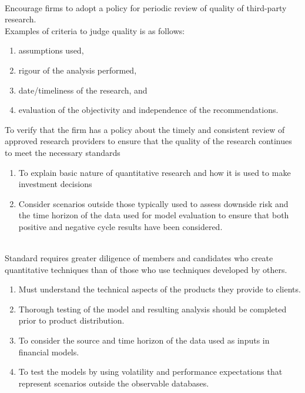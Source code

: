 \begin{remark} \\
Encourage firms to adopt a policy for periodic review of quality of third-party research.\\
Examples of criteria to judge quality is as follows:
\begin{enumerate}[label=\roman*.]
\setlength{\itemsep}{0pt}
\item assumptions used,
\item rigour of the analysis performed,
\item date/timeliness of the research, and
\item evaluation of the objectivity and independence of the recommendations.
\end{enumerate}
To verify that the firm has a policy about the timely and consistent review of approved research providers to ensure that the quality of the research continues to meet the necessary standards
\end{remark}

\begin{remark} 
\begin{enumerate}[label=\roman*.]
\setlength{\itemsep}{0pt}
\item To explain basic nature of quantitative research and how it is used to make investment decisions
\item Consider scenarios outside those typically used to assess downside risk and the time horizon of the data used for model evaluation to ensure that both positive and negative cycle results have been considered.
\end{enumerate}
\end{remark}

\begin{remark} \\
Standard requires greater diligence of members and candidates who create quantitative techniques than of those who use techniques developed by others.
\begin{enumerate}[label=\roman*.]
\setlength{\itemsep}{0pt}
\item Must understand the technical aspects of the products they provide to clients.
\item Thorough testing of the model and resulting analysis should be completed prior to product distribution.
\item To consider the source and time horizon of the data used as inputs in financial models.
\item To test the models by using volatility and performance expectations that represent scenarios outside the observable databases.
\end{enumerate}
\end{remark}

